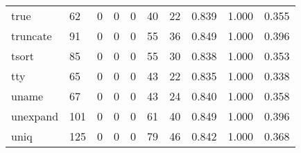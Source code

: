 \begin{longtable}{lp{1.3cm}p{1.3cm}p{1.3cm}p{1.3cm}p{1.3cm}p{1.3cm}p{1.3cm}p{1.3cm}p{1.3cm}}
true      &                     62 &                                             0 &                                            0 &                                           0 &                                           40 &                                         22 &                                0.839 &                                  1.000 &                                0.355 \\
truncate  &                     91 &                                             0 &                                            0 &                                           0 &                                           55 &                                         36 &                                0.849 &                                  1.000 &                                0.396 \\
tsort     &                     85 &                                             0 &                                            0 &                                           0 &                                           55 &                                         30 &                                0.838 &                                  1.000 &                                0.353 \\
tty       &                     65 &                                             0 &                                            0 &                                           0 &                                           43 &                                         22 &                                0.835 &                                  1.000 &                                0.338 \\
uname     &                     67 &                                             0 &                                            0 &                                           0 &                                           43 &                                         24 &                                0.840 &                                  1.000 &                                0.358 \\
unexpand  &                    101 &                                             0 &                                            0 &                                           0 &                                           61 &                                         40 &                                0.849 &                                  1.000 &                                0.396 \\
uniq      &                    125 &                                             0 &                                            0 &                                           0 &                                           79 &                                         46 &                                0.842 &                                  1.000 &                                0.368 \\

\end{longtable}
